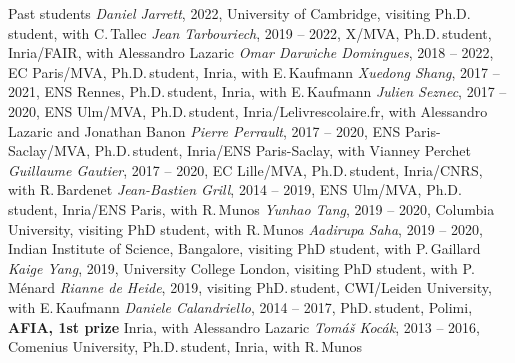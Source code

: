 \documentclass{resume}
\begin{document}
\begin{category}{Past students}
\citembullet \textit{Daniel Jarrett}, 2022, University of Cambridge, visiting Ph.D.\,student, with C.\,Tallec
\citembullet \textit{Jean Tarbouriech}, 2019 -- 2022,  X/MVA, Ph.D.\,student,
Inria/FAIR, with Alessandro Lazaric
\citembullet \textit{Omar Darwiche Domingues}, 2018 -- 2022,  EC Paris/MVA, Ph.D.\,student,
Inria, with E.\,Kaufmann
\citembullet \textit{Xuedong Shang}, 2017 -- 2021,  ENS Rennes, Ph.D.\,student,
Inria, with E.\,Kaufmann
\citembullet \textit{Julien Seznec}, 2017 -- 2020, ENS Ulm/MVA, Ph.D.\,student,
Inria/Lelivrescolaire.fr, with Alessandro Lazaric and Jonathan Banon
\citembullet \textit{Pierre Perrault},  2017 -- 2020, ENS Paris-Saclay/MVA, Ph.D.\,student,
Inria/ENS Paris-Saclay, with Vianney Perchet
\citembullet \textit{Guillaume Gautier},  2017 -- 2020, EC Lille/MVA, Ph.D.\,student,
Inria/CNRS, with R.\,Bardenet
\citembullet \textit{Jean-Bastien Grill}, 2014 -- 2019, ENS Ulm/MVA, Ph.D.\,student,
Inria/ENS Paris, with R.\,Munos
\citembullet \textit{Yunhao Tang}, 2019 -- 2020, Columbia University, visiting PhD student, with R.\,Munos
\citembullet \textit{Aadirupa Saha}, 2019 -- 2020, Indian Institute of Science, Bangalore, visiting PhD student, with P.\,Gaillard
\citembullet \textit{Kaige Yang}, 2019, University College London, visiting PhD student, with P.\,M\'enard
\citembullet \textit{Rianne de Heide}, 2019, visiting PhD.\,student, CWI/Leiden University, with E.\,Kaufmann
\citembullet \textit{Daniele Calandriello}, 2014 -- 2017, PhD.\,student, Polimi, \textbf{AFIA, 1st prize}
Inria, with Alessandro Lazaric
\citembullet \textit{Tom\'a\v s Koc\' ak}, 2013 -- 2016, Comenius University, Ph.D.\,student,
Inria, with R.\,Munos


\end{category}
\end{document}
